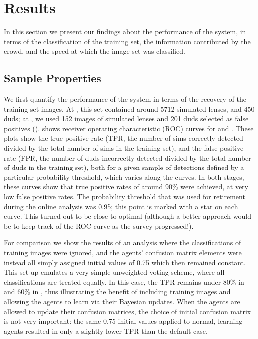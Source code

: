 \documentclass[useAMS,usenatbib,a4paper]{mn2e}
\begin{document}

\section{Results}
\label{sec:results}

In this section we present our findings about the performance of the \SW system,
in terms of the classification of the training set, the  information contributed
by the crowd, and the speed at which the image set was classified.


\subsection{Sample Properties}
\label{sec:results:sample}

We first quantify the performance of the \SW system in terms of the recovery of
the training set images. At \StageOne, this set contained around 5712 simulated
lenses, and 450 duds; at \StageTwo, we used 152 images of simulated lenses and
201 duds selected as \StageOne false positives ().
 shows receiver operating characteristic (ROC)
curves for \cfhtls \StageOne and \StageTwo. These plots show the true positive
rate (TPR, the number of sims correctly detected divided by the total number of
sims in the training set), and the false positive rate (FPR, the number of duds
incorrectly detected  divided by the total number of duds in the training set), both
for a given sample of detections defined by a particular probability threshold,
which varies along the curves.  In both stages, these curves show that true
positive rates of  around 90\% were achieved, at very low false positive rates.
The probability threshold that was used for retirement during the \StageOne online analysis
was 0.95; this point is marked with a star on each curve.
This turned out to be close to optimal (although a better approach would be to
keep track of the ROC curve as the survey progressed!).

For comparison we show the results of an analysis where the classifications of
training images were ignored, and the agents' confusion matrix elements
were instead all simply assigned initial values of 0.75
which then remained constant. This set-up emulates a
very simple unweighted voting scheme, where all classifications are treated
equally.  In this case, the TPR remains under 80\% in \StageOne and 60\% in
\StageTwo, thus illustrating the benefit of including training images and
allowing the agents to learn via their Bayesian updates.
When the agents are allowed to update their confusion matrices, the choice of
initial confusion matrix is not very important: the same 0.75 initial values
applied to normal, learning agents resulted in only a slightly lower TPR than
the default case.
\end{document}
